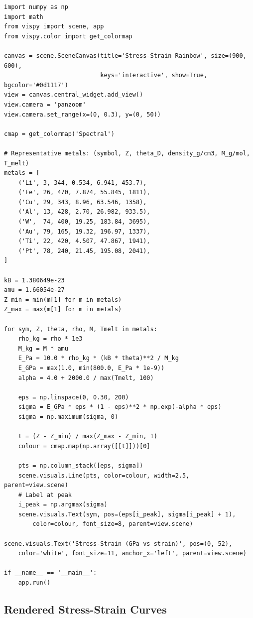 \documentclass[11pt,a4paper]{article}
\begin{document}
\begin{lstlisting}[title={\textbf{Live Stress-Strain Rainbow Window}}]
import numpy as np
import math
from vispy import scene, app
from vispy.color import get_colormap

canvas = scene.SceneCanvas(title='Stress-Strain Rainbow', size=(900, 600),
                           keys='interactive', show=True, bgcolor='#0d1117')
view = canvas.central_widget.add_view()
view.camera = 'panzoom'
view.camera.set_range(x=(0, 0.3), y=(0, 50))

cmap = get_colormap('Spectral')

# Representative metals: (symbol, Z, theta_D, density_g/cm3, M_g/mol, T_melt)
metals = [
    ('Li', 3, 344, 0.534, 6.941, 453.7),
    ('Fe', 26, 470, 7.874, 55.845, 1811),
    ('Cu', 29, 343, 8.96, 63.546, 1358),
    ('Al', 13, 428, 2.70, 26.982, 933.5),
    ('W',  74, 400, 19.25, 183.84, 3695),
    ('Au', 79, 165, 19.32, 196.97, 1337),
    ('Ti', 22, 420, 4.507, 47.867, 1941),
    ('Pt', 78, 240, 21.45, 195.08, 2041),
]

kB = 1.380649e-23
amu = 1.66054e-27
Z_min = min(m[1] for m in metals)
Z_max = max(m[1] for m in metals)

for sym, Z, theta, rho, M, Tmelt in metals:
    rho_kg = rho * 1e3
    M_kg = M * amu
    E_Pa = 10.0 * rho_kg * (kB * theta)**2 / M_kg
    E_GPa = max(1.0, min(800.0, E_Pa * 1e-9))
    alpha = 4.0 + 2000.0 / max(Tmelt, 100)

    eps = np.linspace(0, 0.30, 200)
    sigma = E_GPa * eps * (1 - eps)**2 * np.exp(-alpha * eps)
    sigma = np.maximum(sigma, 0)

    t = (Z - Z_min) / max(Z_max - Z_min, 1)
    colour = cmap.map(np.array([[t]]))[0]

    pts = np.column_stack([eps, sigma])
    scene.visuals.Line(pts, color=colour, width=2.5, parent=view.scene)
    # Label at peak
    i_peak = np.argmax(sigma)
    scene.visuals.Text(sym, pos=(eps[i_peak], sigma[i_peak] + 1),
        color=colour, font_size=8, parent=view.scene)

scene.visuals.Text('Stress-Strain (GPa vs strain)', pos=(0, 52),
    color='white', font_size=11, anchor_x='left', parent=view.scene)

if __name__ == '__main__':
    app.run()
\end{lstlisting}

\subsection{Rendered Stress-Strain Curves}
\end{document}
